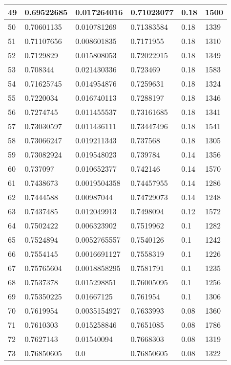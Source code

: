 \begin{longtable}{|l|l|l|l|l|l|}
49 & 0.69522685 & 0.017264016 & 0.71023077 & 0.18 & 1500 \\ \hline 
50 & 0.70601135 & 0.010781269 & 0.71383584 & 0.18 & 1339 \\ \hline 
51 & 0.71107656 & 0.008601835 & 0.7171955 & 0.18 & 1310 \\ \hline 
52 & 0.7129829 & 0.015808053 & 0.72022915 & 0.18 & 1349 \\ \hline 
53 & 0.708344 & 0.021430336 & 0.723469 & 0.18 & 1583 \\ \hline 
54 & 0.71625745 & 0.014954876 & 0.7259631 & 0.18 & 1324 \\ \hline 
55 & 0.7220034 & 0.016740113 & 0.7288197 & 0.18 & 1346 \\ \hline 
56 & 0.7274745 & 0.011455537 & 0.73161685 & 0.18 & 1341 \\ \hline 
57 & 0.73030597 & 0.011436111 & 0.73447496 & 0.18 & 1541 \\ \hline 
58 & 0.73066247 & 0.019211343 & 0.737568 & 0.18 & 1305 \\ \hline 
59 & 0.73082924 & 0.019548023 & 0.739784 & 0.14 & 1356 \\ \hline 
60 & 0.737097 & 0.010652377 & 0.742146 & 0.14 & 1570 \\ \hline 
61 & 0.7438673 & 0.0019504358 & 0.74457955 & 0.14 & 1286 \\ \hline 
62 & 0.7444588 & 0.00987044 & 0.74729073 & 0.14 & 1248 \\ \hline 
63 & 0.7437485 & 0.012049913 & 0.7498094 & 0.12 & 1572 \\ \hline 
64 & 0.7502422 & 0.006323902 & 0.7519962 & 0.1 & 1282 \\ \hline 
65 & 0.7524894 & 0.0052765557 & 0.7540126 & 0.1 & 1242 \\ \hline 
66 & 0.7554145 & 0.0016691127 & 0.7558319 & 0.1 & 1226 \\ \hline 
67 & 0.75765604 & 0.0018858295 & 0.7581791 & 0.1 & 1235 \\ \hline 
68 & 0.7537378 & 0.015298851 & 0.76005095 & 0.1 & 1256 \\ \hline 
69 & 0.75350225 & 0.01667125 & 0.761954 & 0.1 & 1306 \\ \hline 
70 & 0.7619954 & 0.0035154927 & 0.7633993 & 0.08 & 1360 \\ \hline 
71 & 0.7610303 & 0.015258846 & 0.7651085 & 0.08 & 1786 \\ \hline 
72 & 0.7627143 & 0.01540094 & 0.7668303 & 0.08 & 1319 \\ \hline 
73 & 0.76850605 & 0.0 & 0.76850605 & 0.08 & 1322 \\ \hline 

\end{longtable}
